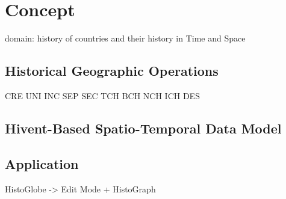 
\section{Concept} %
\label{sec:concept}

domain: history of countries and their history in Time and Space


\subsection{Historical Geographic Operations} %
\label{sub:historical_geographic_operations}

CRE
UNI
INC
SEP
SEC
TCH
BCH
NCH
ICH
DES





\subsection{Hivent-Based Spatio-Temporal Data Model} %
\label{sub:hivent_based_spatio_temporal_data_model}





\subsection{Application} %
\label{sub:application}

HistoGlobe -> Edit Mode + HistoGraph






